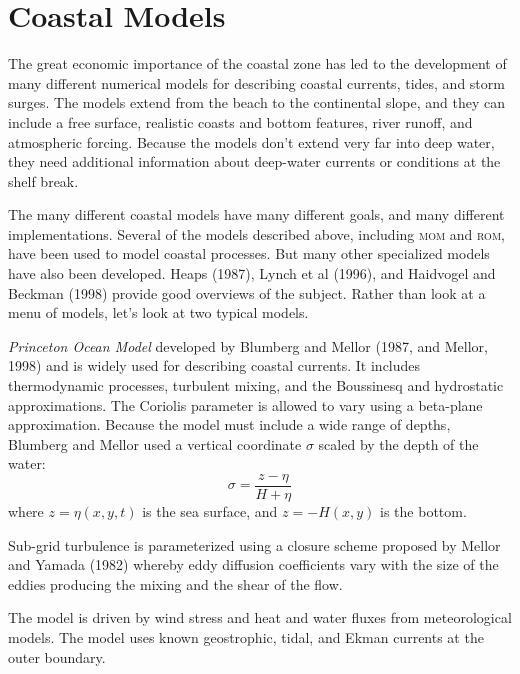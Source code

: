 \section{Coastal Models}
The great economic importance of the coastal zone has led to
the development of many different numerical models for describing coastal currents, tides, and
storm surges. The models extend from the beach to the continental slope, and they can include
a free surface, realistic coasts and bottom features, river runoff, and atmospheric forcing.
Because the models don't extend very far into deep water, they need additional information
about deep-water currents or conditions at the shelf break.

The many different coastal models have many different goals, and many different implementations. Several of the models described above, including \textsc{mom} and \textsc{rom}, have been used to model coastal processes. But many other specialized models have also been developed. Heaps (1987), Lynch et al (1996), and Haidvogel and Beckman (1998) provide good overviews of the subject. Rather than look at a menu of models, let's look at two typical models.

\textit{Princeton Ocean Model} developed by Blumberg and Mellor (1987, and Mellor, 1998) and is widely used for describing coastal currents. It includes thermodynamic processes, turbulent mixing, and the Boussinesq and hydrostatic approximations. The Coriolis parameter is allowed to vary using a beta-plane approximation. Because the model must include a wide range of depths, Blumberg and Mellor used a vertical coordinate $\sigma$ scaled by the depth of the water:
\begin{equation}
\sigma = \frac{z-\eta}{H+\eta}
\end{equation}
where $z=\eta(x, y, t)$ is the sea surface, and $z=-H(x,y)$ is the bottom.

Sub-grid turbulence is parameterized using a closure scheme proposed by Mellor and Yamada (1982) whereby eddy diffusion coefficients vary with the size of the eddies producing the mixing and the shear of the flow.

The model is driven by wind stress and heat and water
fluxes from meteorological models. The model uses known geostrophic, tidal, and Ekman currents
at the outer boundary.

